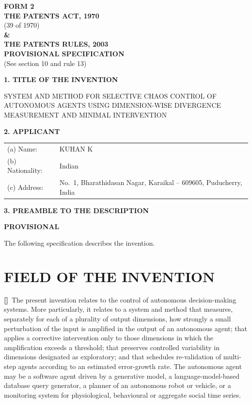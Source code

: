 \documentclass[12pt,a4paper]{article}
\newcounter{para}
\newcommand{\p}{\refstepcounter{para}\textbf{[\thepara]}\ }
\begin{document}
\begin{center}
\textbf{FORM 2}\\[4pt]
\textbf{THE PATENTS ACT, 1970}\\
(39 of 1970)\\
\textbf{\&}\\
\textbf{THE PATENTS RULES, 2003}\\[10pt]
\textbf{PROVISIONAL SPECIFICATION}\\
(See section 10 and rule 13)
\end{center}

\vspace{6pt}
\textbf{1. TITLE OF THE INVENTION}

SYSTEM AND METHOD FOR SELECTIVE CHAOS CONTROL OF AUTONOMOUS AGENTS USING DIMENSION-WISE DIVERGENCE MEASUREMENT AND MINIMAL INTERVENTION

\textbf{2. APPLICANT}

\begin{tabular}{@{}lp{9cm}}
(a) Name: & KUHAN K\\
(b) Nationality: & Indian\\
(c) Address: & No.~1, Bharathidasan Nagar, Karaikal -- 609605, Puducherry, India
\end{tabular}

\textbf{3. PREAMBLE TO THE DESCRIPTION}

\textbf{PROVISIONAL}

The following specification describes the invention.

\section*{FIELD OF THE INVENTION}

\p The present invention relates to the control of autonomous decision-making systems. More particularly, it relates to a system and method that measures, separately for each of a plurality of output dimensions, how strongly a small perturbation of the input is amplified in the output of an autonomous agent; that applies a corrective intervention only to those dimensions in which the amplification exceeds a threshold; that preserves controlled variability in dimensions designated as exploratory; and that schedules re-validation of multi-step agents according to an estimated error-growth rate. The autonomous agent may be a software agent driven by a generative model, a language-model-based database query generator, a planner of an autonomous robot or vehicle, or a monitoring system for physiological, behavioural or aggregate social time series.
\end{document}

